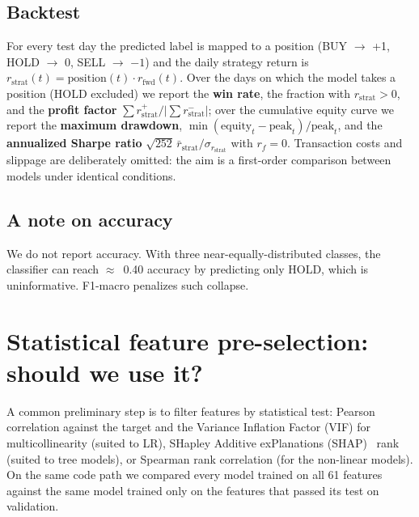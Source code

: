 \documentclass[runningheads]{llncs}
\begin{document}
\subsection{Backtest}
For every test day the predicted label is mapped to a position (BUY $\to$ +1, HOLD $\to$ 0, SELL $\to$ $-1$) and the daily strategy return is $r_{\text{strat}}(t) = \text{position}(t)\cdot r_{\text{fwd}}(t)$. Over the days on which the model takes a position (HOLD excluded) we report the \textbf{win rate}, the fraction with $r_{\text{strat}} > 0$, and the \textbf{profit factor} $\sum r_{\text{strat}}^{+} / |\sum r_{\text{strat}}^{-}|$; over the cumulative equity curve we report the \textbf{maximum drawdown}, $\min (\text{equity}_t - \text{peak}_t)/\text{peak}_t$, and the \textbf{annualized Sharpe ratio} $\sqrt{252}\,\bar r_{\text{strat}}/\sigma_{r_{\text{strat}}}$ with $r_f = 0$. Transaction costs and slippage are deliberately omitted: the aim is a first-order comparison between models under identical conditions.

\subsection{A note on accuracy}
We do not report accuracy. With three near-equally-distributed classes, the classifier can reach $\approx$~0.40 accuracy by predicting only HOLD, which is uninformative. F1-macro penalizes such collapse.

\section{Statistical feature pre-selection: should we use it?}
\label{sec:featselect}

A common preliminary step is to filter features by statistical test: Pearson correlation against the target and the Variance Inflation Factor (VIF) for multicollinearity (suited to LR), SHapley Additive exPlanations (SHAP)~\cite{lundberg2017} rank (suited to tree models), or Spearman rank correlation (for the non-linear models). On the same code path we compared every model trained on all 61 features against the same model trained only on the features that passed its test on validation.
\end{document}
